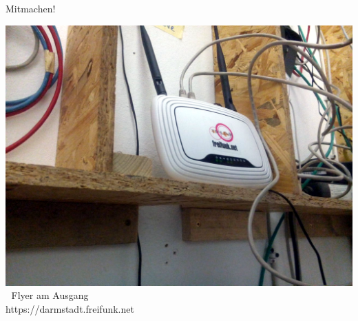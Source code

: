 \documentclass{beamer}
\begin{document}
\begin{frame}{Mitmachen!}
\vfill
\begin{center}
\includegraphics[height=0.5\textheight]{images/irl_router}$\;$
\vfill
Flyer am Ausgang \\
https://darmstadt.freifunk.net
\end{center}
\end{frame}
\end{document}
